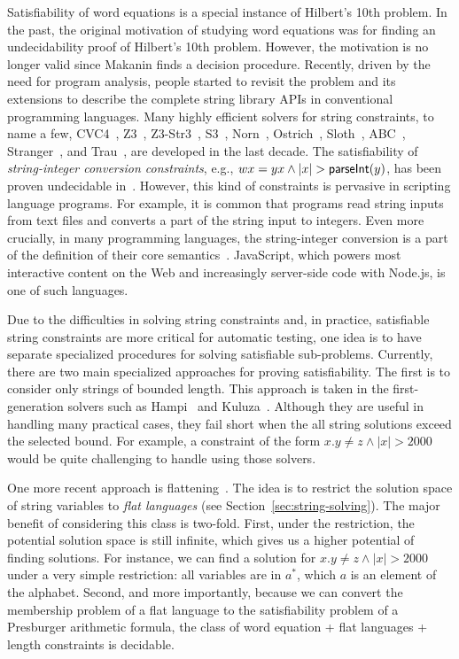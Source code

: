 Satisfiability of word equations is a special instance of Hilbert’s 10th problem. 
In the past, the original motivation of studying word equations was for finding an undecidability proof of Hilbert’s 10th problem. 
However, the motivation is no longer valid since Makanin finds a decision procedure. Recently, driven by the need for program analysis, people started to revisit the problem and its extensions to describe the complete string library APIs in conventional programming languages. Many highly efficient solvers for string constraints, to name a few, CVC4~\cite{cvc4Tool}, Z3~\cite{z3}, Z3-Str3~\cite{zheng2013z3}, S3~\cite{trinh2014s3}, Norn~\cite{abdulla2015norn}, Ostrich~\cite{chen2017decidable}, Sloth~\cite{sloth}, ABC~\cite{aydin2018parameterized}, Stranger~\cite{yu2010stranger}, and Trau~\cite{abdulla2018trau}, are developed in the last decade.
The satisfiability of \emph{string-integer conversion constraints}, e.g., $wx=yx \wedge |x| > \textsf{parseInt}(y)$, has been proven undecidable in~\cite{DayGHMN18}. 
However, this kind of constraints is pervasive in scripting language programs. 
For example, it is common that programs read string inputs from text files and converts a part of the string input to integers.
Even more crucially, in many programming languages, the string-integer conversion is a part of the definition of their core semantics~\cite{ecmascript2019ecmascript}. 
JavaScript, which powers most interactive content on the Web and increasingly server-side code with Node.js, is one of such languages. 

Due to the difficulties in solving string constraints and, in practice, satisfiable string constraints are more critical for automatic testing, one idea is to have separate specialized procedures for solving satisfiable sub-problems. 
Currently, there are two main specialized approaches for proving satisfiability.
The first is to consider only strings of bounded length.
This approach is taken in the first-generation solvers such as Hampi~\cite{KiezunGAGHE12} and Kuluza~\cite{SaxenaAHMMS10}.
Although they are useful in handling many practical cases, they fail short when the all string solutions exceed the selected bound.
For example, a constraint of the form $x.y \neq z  \wedge |x| > 2000$ would be quite challenging to handle using those solvers.

One more recent approach is flattening~\cite{Parosh:20:PLDI,AbdullaACDHRR18,AbdullaACDHRR17}.
The idea is to restrict the solution space of string variables to 
\emph{flat languages} (see Section~\ref{sec:string-solving}). 
The major benefit of considering this class is two-fold.
First, under the restriction, the potential solution space is still infinite, which gives us a higher potential of finding solutions.
For instance, we can find a solution for $x.y \neq z  \wedge |x| > 2000$ under a very simple restriction: all variables are in $a^*$, which $a$ is an element of the alphabet.
Second, and more importantly, because we can convert the membership problem of a flat language to the satisfiability problem of a Presburger arithmetic formula, the class of word equation + flat languages + length constraints is decidable.

